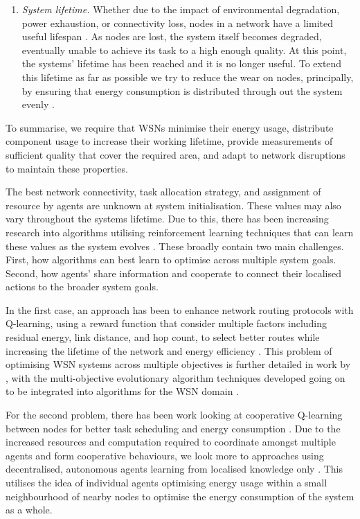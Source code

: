 \begin{enumerate}
\item \label{requirement:lifetime} \textit{System lifetime.} Whether due to the impact of environmental degradation, power exhaustion, or connectivity loss, nodes in a network have a limited useful lifespan \citep{Mak2009}. As nodes are lost, the system itself becomes degraded, eventually unable to achieve its task to a high enough quality. At this point, the systems' lifetime has been reached and it is no longer useful. To extend this lifetime as far as possible we try to reduce the wear on nodes, principally, by ensuring that energy consumption is distributed through out the system evenly \citep{BABAYO20171176, Engmann2018}.
\end{enumerate}
To summarise, we require that WSNs minimise their energy usage, distribute component usage to increase their working lifetime, provide measurements of sufficient quality that cover the required area, and adapt to network disruptions to maintain these properties.

The best network connectivity, task allocation strategy, and assignment of resource by agents are unknown at system initialisation. These values may also vary throughout the systems lifetime. Due to this, there has been increasing research into algorithms utilising reinforcement learning techniques that can learn these values as the system evolves \citep{Al-Rawi2015}. These broadly contain two main challenges. First, how algorithms can best learn to optimise across multiple system goals. Second, how agents' share information and cooperate to connect their localised actions to the broader system goals.   

In the first case, an approach has been to enhance network routing protocols with Q-learning, using a reward function that consider multiple factors including residual energy, link distance, and hop count, to select better routes while increasing the lifetime of the network and energy efficiency \citep{Guo2019}. This problem of optimising WSN systems across multiple objectives is further detailed in work by \cite{ s150717572}, with the multi-objective evolutionary algorithm techniques developed going on to be integrated into algorithms for the WSN domain \citep{4633340,SENGUPTA2013405}.

For the second problem, there has been work looking at cooperative Q-learning between nodes for better task scheduling and energy consumption \citep{doi:10.1155/2014/765182}. Due to the increased resources and computation required to coordinate amongst multiple agents and form cooperative behaviours, we look more to approaches using decentralised, autonomous agents learning from localised knowledge only \citep{10.1007/978-3-642-11814-2_4}.  This utilises the idea of individual agents optimising energy usage within a small neighbourhood of nearby nodes to optimise the energy consumption of the system as a whole. 

